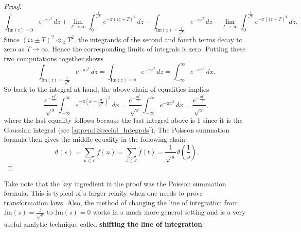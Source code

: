 \documentclass[12pt]{book}
\theoremstyle{definition}\newframedtheorem{method}{Method}
\newcommand{\Z}{\mathbb{Z}}
\newcommand{\vt}{\vartheta}
\newcommand{\<}{\langle}
\renewcommand{\>}{\rangle}
\renewcommand{\Im}{\mathrm{Im}}
\begin{document}
\begin{proof}
        \[
          \int_{\Im(z) = 0}e^{-\pi z^{2}}\,dz+\lim_{T \to \infty}\int_{0}^{\frac{t}{\sqrt{s}}}e^{-\pi(iz+T)^{2}}\,dz-\int_{\Im(z) = \frac{t}{\sqrt{s}}}e^{-\pi z^{2}}\,dz-\lim_{T \to \infty}\int_{0}^{\frac{t}{\sqrt{s}}}e^{-\pi(iz-T)^{2}}\,dz.
        \]
        Since $(iz \pm T)^{2} \ll_{z} T^{2}$, the integrands of the second and fourth terms decay to zero as $T \to \infty$. Hence the corresponding limits of integrals is zero. Putting these two computations together shows
        \[
          \int_{\Im(z) = \frac{t}{\sqrt{s}}}e^{-\pi z^{2}}\,dz = \int_{\Im(z) = 0}e^{-\pi z^{2}}\,dz = \int_{-\infty}^{\infty}e^{-\pi x^{2}}\,dx.
        \]
        So back to the integral at hand, the above chain of equalities implies
        \[
          \frac{e^{-\frac{\pi t^{2}}{s}}}{\sqrt{s}}\int_{-\infty}^{\infty}e^{-\pi\left(x+\frac{it}{\sqrt{s}}\right)^{2}}\,dx = \frac{e^{-\frac{\pi t^{2}}{s}}}{\sqrt{s}}\int_{-\infty}^{\infty}e^{-\pi x^{2}}\,dx = \frac{e^{-\frac{\pi t^{2}}{s}}}{\sqrt{s}},
        \]
        where the last equality follows because the last integral above is $1$ since it is the Gaussian integral (see \cref{append:Special_Integrals}). The Poisson summation formula then gives the middle equality in the following chain:
        \[
          \vt(s) = \sum_{n \in \Z}f(n) = \sum_{t \in \Z}\hat{f}(t) = \frac{1}{\sqrt{s}}\vt\left(\frac{1}{s}\right).
        \]
      \end{proof}

      Take note that the key ingredient in the proof was the Poisson summation formula. This is typical of a larger relaity when one needs to prove transformation laws. Also, the method of changing the line of integration from $\Im(z) = \frac{t}{\sqrt{s}}$ to $\Im(z) = 0$ works in a much more general setting and is a very useful analytic technique called \textbf{shifting the line of integration}:
\end{document}
